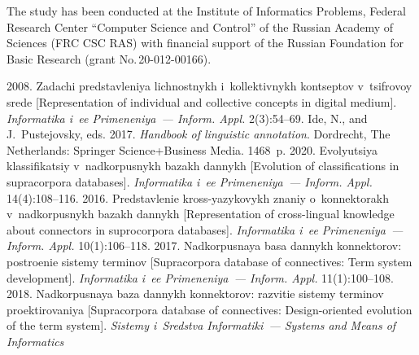 
\vspace*{-15pt}

\Ack
\noindent
The study has been conducted at the Institute of Informatics Problems, Federal Research Center 
``Computer Science and Control'' of the Russian Academy of Sciences (FRC CSC RAS) with financial 
support of the Russian Foundation for Basic Research (grant No.\,20-012-00166).

  \begin{multicols}{2}

\renewcommand{\bibname}{\protect\rmfamily References}

{\small\frenchspacing
 {%
 \begin{thebibliography}{99}
 2008. Zadachi predstavleniya 
lichnostnykh i~kollektivnykh kontseptov v~tsifrovoy srede [Representation of individual and collective 
concepts in digital medium]. \textit{Informatika i~ee Primeneniya~--- Inform. Appl.} 2(3):54--69.
Ide, N., and J.~Pustejovsky, eds. 2017. \textit{Handbook of linguistic annotation}. Dordrecht, The 
Netherlands: Springer Science\;+\;Business Media. 1468~p.
 2020. Evolyutsiya klassifikatsiy 
v~nadkorpusnykh ba\-zakh dannykh [Evolution of classifications in supracorpora databases]. 
\textit{Informatika i~ee Primeneniya~--- Inform. Appl.} 14(4):108--116.
 2016. Predstavlenie kross-yazykovykh znaniy o~konnektorakh v~nadkorpusnykh 
 bazakh dannykh [Representation of cross-lingual 
knowledge about connectors in suprocorpora databases]. 
\textit{Informatika i~ee Primeneniya~--- Inform. Appl.} 10(1):106--118.
 2017. Nadkorpusnaya basa dannykh 
konnektorov: postroenie sistemy terminov [Supracorpora database of connectives: Term system 
development]. \textit{Informatika i~ee Primeneniya~--- Inform. Appl.} 11(1):100--108.
 2018. Nadkorpusnaya baza dannykh konnektorov: razvitie 
sistemy terminov proektirovaniya [Supracorpora database of connectives: Design-oriented evolution of 
the term system]. \textit{Sistemy i~Sredstva Informatiki~--- Systems and Means of Informatics} 

\end{thebibliography}}}
\end{multicols}
